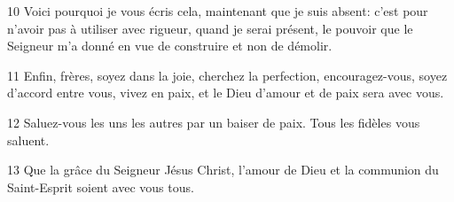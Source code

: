 
10 Voici pourquoi je vous écris cela, maintenant que je suis absent: c’est pour n’avoir pas à utiliser avec rigueur, quand je serai présent, le pouvoir que le Seigneur m’a donné en vue de construire et non de démolir.

11 Enfin, frères, soyez dans la joie, cherchez la perfection, encouragez-vous, soyez d’accord entre vous, vivez en paix, et le Dieu d’amour et de paix sera avec vous.

12 Saluez-vous les uns les autres par un baiser de paix. Tous les fidèles vous saluent.

13 Que la grâce du Seigneur Jésus Christ, l’amour de Dieu et la communion du Saint-Esprit soient avec vous tous.